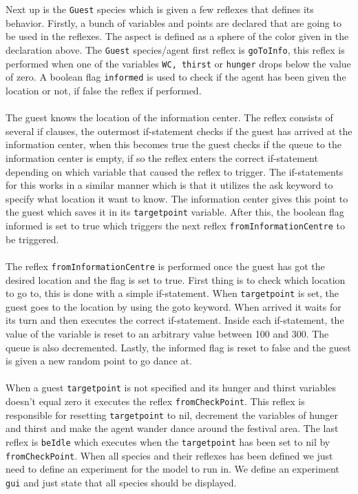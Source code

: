 \documentclass[a4paper,10pt]{article}
\begin{document}
\\\\Next up is the \texttt{Guest} species which is given a few reflexes that defines its behavior. Firstly, a bunch of variables and points are declared that are going to be used in the reflexes. The aspect is defined as a sphere of the color given in the declaration above. The \texttt{Guest} species/agent first reflex is \texttt{goToInfo}, this reflex is performed when one of the variables \texttt{WC, thirst} or \texttt{hunger} drops below the value of zero. A boolean flag \texttt{informed} is used to check if the agent has been given the location or not, if false the reflex if performed. \\\\The guest knows the location of the information center. The reflex consists of several if clauses,  the outermost if-statement checks if the guest has arrived at the information center, when this becomes true the guest checks if the queue to the information center is empty, if so the reflex enters the correct if-statement depending on which variable that caused the reflex to trigger. The if-statements for this works in a similar manner which is that it utilizes the ask keyword to specify what location it want to know. The information center gives this point to the guest which saves it in its \texttt{targetpoint} variable. After this, the boolean flag informed is set to true which triggers the next reflex \texttt{fromInformationCentre} to be triggered. \\\\The reflex \texttt{fromInformationCentre} is performed once the guest has got the desired location and the flag is set to true. First thing is to check which location to go to, this is done with a simple if-statement. When \texttt{targetpoint} is set, the guest goes to the location by using the goto keyword. When arrived it waits for its turn and then executes the correct if-statement. Inside each if-statement, the value of the variable is reset to an arbitrary value between 100 and 300. The queue is also decremented. Lastly, the informed flag is reset to false and the guest is given a new random point to go dance at. \\\\When a guest \texttt{targetpoint} is not specified and its hunger and thirst variables doesn’t equal zero it executes the reflex \texttt{fromCheckPoint}. This reflex is responsible for resetting \texttt{targetpoint} to nil, decrement the variables of hunger and thirst and make the agent wander dance around the festival area. The last reflex is \texttt{beIdle} which executes when the \texttt{targetpoint} has been set to nil by \texttt{fromCheckPoint}. When all species and their reflexes has been defined we just need to define an experiment for the model to run in. We define an experiment \texttt{gui} and just state that all species should be displayed.
\end{document}

